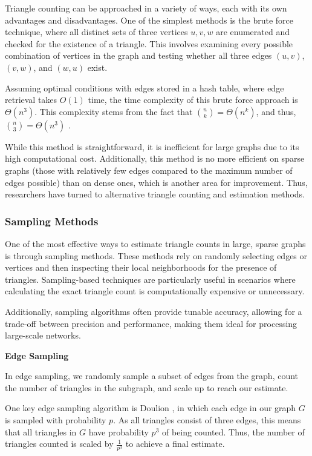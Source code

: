 \documentclass[11pt]{article}
\newcommand{\subsubsubsection}[1]{
  \vspace{1em} %
  \noindent\textbf{#1} %
  \vspace{0.5em} %
}
\begin{document}
Triangle counting can be approached in a variety of ways, each with its own advantages and disadvantages. 
One of the simplest methods is the brute force technique, where all distinct sets of three vertices ${u, v, w}$ are enumerated and checked for the existence of a triangle.
This involves examining every possible combination of vertices in the graph and testing whether all three edges $(u, v)$, $(v, w)$, and $(w, u)$ exist. 

Assuming optimal conditions with edges stored in a hash table, where edge retrieval takes $O(1)$ time, the time complexity of this brute force approach is $\Theta(n^3)$. 
This complexity stems from the fact that ${n \choose k} = \Theta(n^k)$, and thus, ${n \choose 3} = \Theta(n^3)$ \cite{al_hasan_triangle_2018}. 

While this method is straightforward, it is inefficient for large graphs due to its high computational cost.
Additionally, this method is no more efficient on sparse graphs (those with relatively few edges compared to the maximum number of edges possible) than on dense ones, which is another area for improvement.
Thus, researchers have turned to alternative triangle counting and estimation methods.

\subsubsection{Sampling Methods}

One of the most effective ways to estimate triangle counts in large, sparse graphs is through sampling methods.
These methods rely on randomly selecting edges or vertices and then inspecting their local neighborhoods for the presence of triangles.
Sampling-based techniques are particularly useful in scenarios where calculating the exact triangle count is computationally expensive or unnecessary.

Additionally, sampling algorithms often provide tunable accuracy, allowing for a trade-off between precision and performance, making them ideal for processing large-scale networks.

\subsubsubsection{Edge Sampling}

In edge sampling, we randomly sample a subset of edges from the graph, count the number of triangles in the subgraph, and scale up to reach our estimate.

One key edge sampling algorithm is Doulion \cite{tsourakakis_doulion_2009}, in which each edge in our graph $G$ is sampled with probability $p$.
As all triangles consist of three edges, this means that all triangles in $G$ have probability $p^3$ of being counted.
Thus, the number of triangles counted is scaled by $\frac{1}{p^3}$ to achieve a final estimate.
\end{document}
